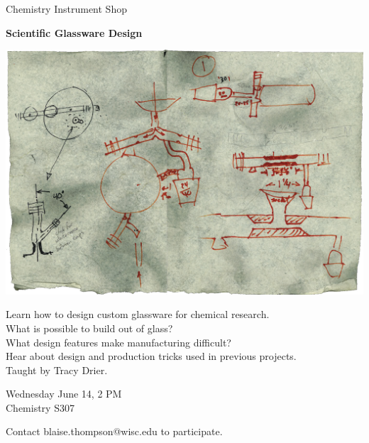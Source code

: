 \documentclass{article}
\begin{document}
\center

\Huge

Chemistry Instrument Shop

\textbf{
Scientific Glassware Design
}

\includegraphics[width=\linewidth]{coverart.png}

{
\LARGE
Learn how to design custom glassware for chemical research. \\
What is possible to build out of glass? \\
What design features make manufacturing difficult? \\
Hear about design and production tricks used in previous projects. \\
Taught by Tracy Drier. \\
}

\vfill

{
\huge
Wednesday June 14, 2 PM \\
Chemistry S307
}

\vfill

{
\huge
Contact blaise.thompson@wisc.edu to participate.
}
\end{document}
